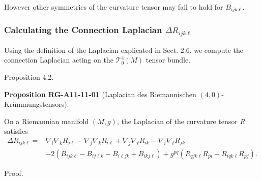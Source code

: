 \documentclass[10pt, letterpaper]{article}
\newcommand{\CustomHeading}[3]{%
  \par\medskip\noindent%
  \textbf{#1 #2} \textnormal{(#3)}.\enskip%
}
\newenvironment{PROP}[2]{\begin{unitbox}\CustomHeading{Proposition}{#1}{#2}}{\end{unitbox}}
\begin{document}
However other symmetries of the curvature tensor may fail to hold for $B_{i j k \ell}$.


\subsubsection*{Calculating the Connection Laplacian $\Delta R_{i j k \ell}$}



Using the definition of the Laplacian explicated in Sect. 2.6, we compute the connection Laplacian acting on the $\mathscr{T}_{0}^{4}(M)$ tensor bundle.



Proposition 4.2. 


\begin{PROP}{RG-A11-11-01}{Laplacian des Riemannischen $(4,0)$-Krümmungstensors}
On a Riemannian manifold $(M, g)$, the Laplacian of the curvature tensor $R$ satisfies
$$
\begin{aligned}
\Delta R_{i j k \ell}= & \nabla_{i} \nabla_{k} R_{j \ell}-\nabla_{j} \nabla_{k} R_{i \ell}+\nabla_{j} \nabla_{\ell} R_{i k}-\nabla_{i} \nabla_{\ell} R_{j k} \\
& -2\left(B_{i j k \ell}-B_{i j \ell k}-B_{i \ell j k}+B_{i k j \ell}\right)+g^{p q}\left(R_{q j k \ell} R_{p i}+R_{i q k \ell} R_{p j}\right) .
\end{aligned}
$$
\end{PROP}

Proof. 
\end{document}

